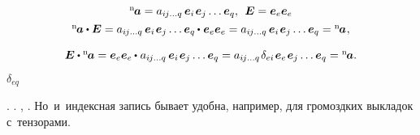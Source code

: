 \nopagebreak\vspace{-0.1em}\[\begin{array}{c}
{^\mathrm{n}\hspace{-0.2ex}\bm{a}} = a_{i\hspace{-0.1ex}j \ldots q} \hspace{.4ex} \bm{e}_i \hspace{.2ex} \bm{e}_j \ldots \bm{e}_q , \;\,  \UnitDyad = \bm{e}_e \bm{e}_e
\\[.4em]
%
{^\mathrm{n}\hspace{-0.2ex}\bm{a}} \dotp \UnitDyad = a_{i\hspace{-0.1ex}j \ldots q} \hspace{.4ex} \bm{e}_i \hspace{.2ex} \bm{e}_j \ldots \tikzmark{BeginDeltaEQBrace} {\bm{e}_q \hspace{-0.1ex} \dotp \hspace{.1ex} \bm{e}_e} \tikzmark{EndDeltaEQBrace} \bm{e}_e = a_{i\hspace{-0.1ex}j \ldots q} \hspace{.4ex} \bm{e}_i \hspace{.2ex} \bm{e}_j \ldots \bm{e}_q = {^\mathrm{n}\hspace{-0.2ex}\bm{a}} \hspace{.1ex},
\\[1.1em]
%
\UnitDyad \dotp {^\mathrm{n}\hspace{-0.2ex}\bm{a}} = \bm{e}_e \bm{e}_e \hspace{-0.1ex} \dotp \hspace{.1ex}  a_{i\hspace{-0.1ex}j \ldots q} \hspace{.4ex} \bm{e}_i \hspace{.2ex} \bm{e}_j \ldots \bm{e}_q = a_{i\hspace{-0.1ex}j \ldots q} \hspace{.2ex} \delta_{ei} \hspace{.2ex} \bm{e}_e \hspace{.2ex} \bm{e}_j \ldots \bm{e}_q = {^\mathrm{n}\hspace{-0.2ex}\bm{a}}.
\end{array}\]
%
{${\scriptstyle \delta_{eq}}$}

\vspace{-0.5em}
   .
  .
 ,    .
\foreignlanguage{russian}{Но~и~индексная запись бывает удобна, например, для громоздких выкладок с~тензорами.}

